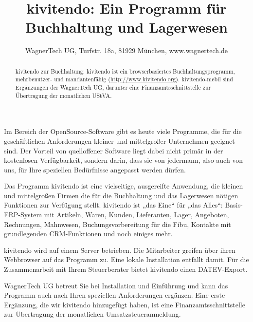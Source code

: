 \documentclass{scrartcl}
\title{kivitendo: Ein Programm für Buchhaltung und Lagerwesen}
\author{WagnerTech UG, Turfstr. 18a, 81929 München, www.wagnertech.de}
\date{\vspace{-5ex}}
\begin{document}
\maketitle

\begin{abstract}
kivitendo zur Buchhaltung: kivitendo ist ein browserbasiertes Buchhaltungsprogramm, mehrbenutzer- und mandantenfähig (\url{http://www.kivitendo.org}). kivitendo-mebil sind Ergänzungen der WagnerTech UG, darunter eine Finanzamtsschnittstelle zur Übertragung
der monatlichen UStVA.

\end{abstract}

\begin{multicols}{2}
Im Bereich der OpenSource-Software gibt es heute viele Programme, die für die geschäftlichen Anforderungen kleiner und mittelgroßer Unternehmen geeignet sind. Der Vorteil von quelloffener Software liegt dabei nicht primär in der kostenlosen Verfügbarkeit, sondern darin, dass sie von jedermann, also auch von uns, für Ihre speziellen Bedürfnisse angepasst werden dürfen.

Das Programm kivitendo ist eine vielseitige, ausgereifte Anwendung, die kleinen und mittelgroßen Firmen
die für die Buchhaltung und das Lagerwesen nötigen Funktionen zur Verfügung stellt. kivitendo ist „das Eine“ für „das Alles“: Basis-ERP-System mit Artikeln, Waren, Kunden, Lieferanten, Lager, Angeboten, Rechnungen, Mahnwesen, Buchungsvorbereitung für die Fibu, Kontakte mit grundlegenden CRM-Funktionen und noch einiges mehr.

kivitendo wird auf einem Server betrieben. Die Mitarbeiter greifen über ihren Webbrowser auf das Programm zu. Eine lokale
Installation entfällt damit.
Für die Zusammenarbeit mit Ihrem Steuerberater bietet kivitendo einen DATEV-Export.

WagnerTech UG betreut Sie bei Installation und Einführung und kann das Programm auch nach Ihren speziellen Anforderungen
ergänzen. Eine erste Ergänzung, die wir kivitendo hinzugefügt haben, ist eine Finanzamtsschnittstelle zur Übertragung der
monatlichen Umsatzsteueranmeldung.
\end{multicols}

\begin{figure} [h]
   \centering
   \label{abb:screenshot}
\end{figure}
\end{document}
